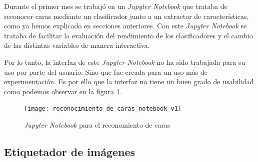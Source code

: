 Durante el primer mes se trabajó en un \textit{Jupyter Notebook} que trataba de reconocer caras mediante un clasificador junto a un extractor de características, como ya hemos explicado en secciones anteriores. Con este \textit{Jupyter Notebook} se trataba de facilitar la evaluación del rendimiento de los clasificadores y el cambio de las distintas variables de manera interactiva. 

Por lo tanto, la interfaz de este \textit{Jupyter Notebook} no ha sido trabajada para su uso por parte del usuario. Sino que fue creada para un uso más de experimentación. Es por ello que la interfaz no tiene un buen grado de usabilidad como podemos observar en la figura \ref{fig:C.5.1}.

\begin{figure}
\centering
\texttt{[image: reconocimiento\_de\_caras\_notebook\_v1]}
\caption{\textit{Jupyter Notebook} para el reconomiento de caras}
\label{fig:C.5.1}
\end{figure}

\subsection{Etiquetador de imágenes}

